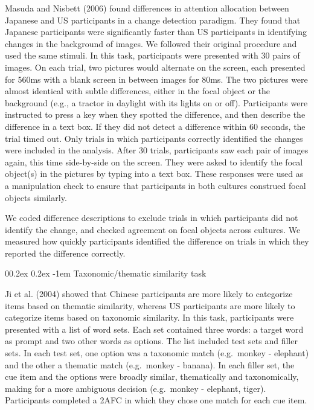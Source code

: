 \documentclass[
  man]{apa6}
\makeatletter
\let\oldparagraph\paragraph
\renewcommand{\paragraph}[1]{\oldparagraph{#1}\mbox{}}
\renewcommand{\paragraph}{\@startsection{paragraph}{4}{\parindent}%
  {0\baselineskip \@plus 0.2ex \@minus 0.2ex}%
  {-1em}%
  {\normalfont\normalsize\bfseries\itshape\typesectitle}}
\makeatother
\begin{document}
Masuda and Nisbett (2006) found differences in attention allocation between Japanese and US participants in a change detection paradigm. They found that Japanese participants were significantly faster than US participants in identifying changes in the background of images. We followed their original procedure and used the same stimuli. In this task, participants were presented with 30 pairs of images. On each trial, two pictures would alternate on the screen, each presented for 560ms with a blank screen in between images for 80ms. The two pictures were almost identical with subtle differences, either in the focal object or the background (e.g., a tractor in daylight with its lights on or off). Participants were instructed to press a key when they spotted the difference, and then describe the difference in a text box. If they did not detect a difference within 60 seconds, the trial timed out. Only trials in which participants correctly identified the changes were included in the analysis. After 30 trials, participants saw each pair of images again, this time side-by-side on the screen. They were asked to identify the focal object(s) in the pictures by typing into a text box. These responses were used as a manipulation check to ensure that participants in both cultures construed focal objects similarly.

We coded difference descriptions to exclude trials in which participants did not identify the change, and checked agreement on focal objects across cultures. We measured how quickly participants identified the difference on trials in which they reported the difference correctly.

\hypertarget{taxonomicthematic-similarity-task}{%
\paragraph{Taxonomic/thematic similarity task}\label{taxonomicthematic-similarity-task}}

Ji et al. (2004) showed that Chinese participants are more likely to categorize items based on thematic similarity, whereas US participants are more likely to categorize items based on taxonomic similarity. In this task, participants were presented with a list of word sets. Each set contained three words: a target word as prompt and two other words as options. The list included test sets and filler sets. In each test set, one option was a taxonomic match (e.g.~monkey - elephant) and the other a thematic match (e.g.~monkey - banana). In each filler set, the cue item and the options were broadly similar, thematically and taxonomically, making for a more ambiguous decision (e.g.~monkey - elephant, tiger). Participants completed a 2AFC in which they chose one match for each cue item.
\end{document}
